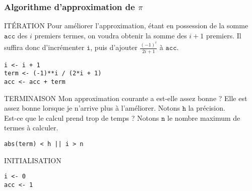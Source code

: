 \documentclass[10pt]{beamer}
\begin{document}
\begin{frame}[fragile]
  \frametitle{Algorithme d'approximation de $\pi$}
  \begin{block}{ITÉRATION}
    Pour \alert{améliorer} l'approximation, étant en possession de la somme $\mathtt{acc}$ des $i$ premiers termes, on voudra obtenir la somme des $i+1$ premiers. Il suffira donc d'incrémenter $\mathtt{i}$, \alert{puis} d'ajouter $ \frac{(-1)^{i}}{2i+ 1}$ à $\mathtt{acc}$.    
    \begin{lstlisting}[style=editor]
i <- i + 1
term <- (-1)**i / (2*i + 1)
acc <- acc + term

    \end{lstlisting}    
  \end{block}
  
  \begin{block}{TERMINAISON}
    Mon approximation courante a est-elle \alert{assez bonne} ? Elle est assez bonne lorsque je n'arrive plus à l'améliorer. Notons $\mathtt{h}$ la précision. \\
     Est-ce que le calcul \alert{prend trop de temps} ? Notons $\mathtt{n}$ le nombre maximum de termes à calculer.
\begin{lstlisting}[style=editor]
 abs(term) < h || i > n
\end{lstlisting}
\end{block}
\begin{block}{INITIALISATION}
  \begin{lstlisting}[style=edblock]
i <- 0
acc <- 1
\end{lstlisting}
\end{block}
\end{frame}
\end{document}
